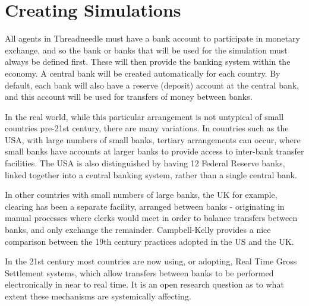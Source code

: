 \documentclass[10pt,oneside,openright, a4paper]{memoir}
\begin{document}
\chapter{Creating Simulations}
All agents in Threadneedle must have a bank account to participate
in monetary exchange, and so  
the bank or banks that will be used for the simulation must always
be defined first. These will 
then provide the banking system within the economy. A central bank
will be created automatically for each country. By default,
each bank will also have a reserve (deposit) account at the central
bank, and this account will be used for transfers of money between
banks.
\par
In the real world, while this particular arrangement is not untypical
of small countries pre-21st century, there are many variations.
In countries such as the USA, with large numbers of small banks,
tertiary arrangements can occur, where small banks have accounts
at larger banks to provide access to inter-bank transfer facilities.
The USA is also distinguished by having 12 Federal Reserve banks,
linked together into a central banking system, rather than a single
central bank.
\par
In other countries with small numbers of large banks,  the UK for example, 
clearing has been a separate facility, arranged between banks - originating in 
manual processes where clerks would meet in order to balance
transfers between banks, and only exchange the remainder. Campbell-Kelly\cite{campbell.2010}
provides a nice comparison between the 19th century practices adopted
in the US and the UK.
\par
In the 21st century most countries are now using, or adopting, Real Time Gross
Settlement systems, which allow transfers between banks to be performed
electronically in near to real time. It is an open research question
as to what extent these mechanisms are systemically affecting.
\par
\end{document}
